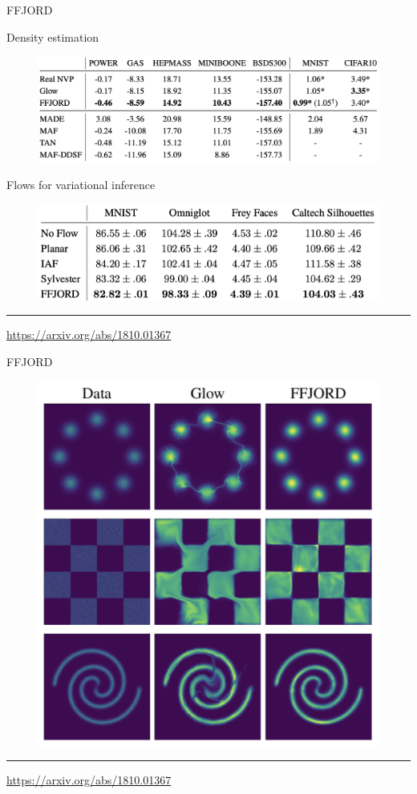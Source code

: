 \begin{frame}{FFJORD}
	\begin{block}{Density estimation}
		\begin{figure}
			\centering
			\includegraphics[width=0.8\linewidth]{figs/ffjord_results}
		\end{figure}
	\end{block}
	\begin{block}{Flows for variational inference}
		\begin{figure}
			\centering
			\includegraphics[width=0.8\linewidth]{figs/ffjord_vae}
		\end{figure}
	\end{block}
	\vfill
	\hrule\medskip
	{\scriptsize \href{https://arxiv.org/abs/1810.01367}{https://arxiv.org/abs/1810.01367}} 
\end{frame}
\begin{frame}{FFJORD}
\begin{figure}
    \centering
    \includegraphics[width=0.6\linewidth]{figs/ffjord.png}
\end{figure}
\vfill
\hrule\medskip
{\scriptsize \href{https://arxiv.org/abs/1810.01367}{https://arxiv.org/abs/1810.01367}} 
\end{frame}
